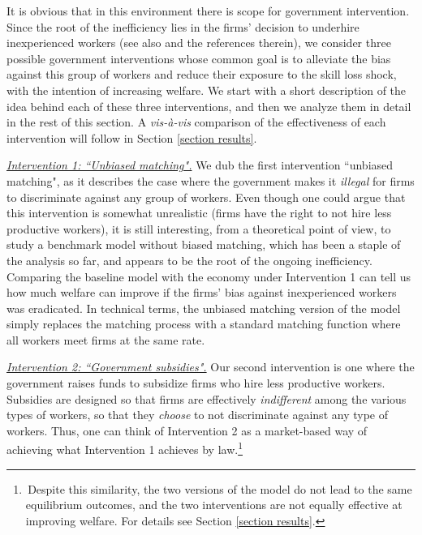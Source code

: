 \documentclass[12pt]{article} %
\theoremstyle{definition}
\begin{document}
  
It is obvious that in this environment there is scope for government intervention. Since the root of the inefficiency lies in the firms' decision to underhire inexperienced workers (see also \cite{pallais2014inefficient} and the references therein), we consider three possible government interventions whose common goal is to alleviate the bias against this group of workers and reduce their exposure to the skill loss shock, with the intention of increasing welfare. We start with a short description of the idea behind each of these three interventions, and then we analyze them in detail in the rest of this section. A \textit{vis-\`a-vis} comparison of the effectiveness of each intervention will follow in Section \ref{section results}. 

\medskip

\underline{\textit{Intervention 1: ``Unbiased matching".}} We dub the first intervention ``unbiased matching", as it describes the case where the government makes it \textit{illegal} for firms to discriminate against any group of workers. Even though one could argue that this intervention is somewhat unrealistic (firms have the right to not hire less productive workers), it is still interesting, from a theoretical point of view, to study a benchmark model without biased matching, which has been a staple of the analysis so far, and appears to be the root of the ongoing inefficiency. Comparing the baseline model with the economy under Intervention 1 can tell us how much welfare can improve if the firms' bias against inexperienced workers was eradicated. In technical terms, the unbiased matching version of the model simply replaces the \cite{petrongolo2001looking} matching process with a standard \cite{pissarides2000equilibrium} matching function where all workers meet firms at the same rate. 

\medskip

\underline{\textit{Intervention 2: ``Government subsidies".}} Our second intervention is one where the government raises funds to subsidize firms who hire less productive workers. Subsidies are designed so that firms are effectively \textit{indifferent} among the various types of workers, so that they \textit{choose} to not discriminate against any type of workers. Thus, one can think of Intervention 2 as a market-based way of achieving what Intervention 1 achieves by law.\footnote{\,Despite this similarity, the two versions of the model do not lead to the same equilibrium outcomes, and the two interventions are not equally effective at improving welfare. For details see Section \ref{section results}.} 
\end{document}
